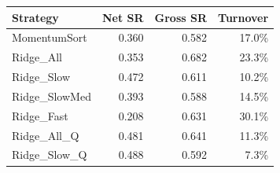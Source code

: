 \begin{tabular}{lrrr}
\toprule
Strategy & Net SR & Gross SR & Turnover \\
\midrule
MomentumSort & 0.360 & 0.582 & 17.0\% \\
Ridge\_All & 0.353 & 0.682 & 23.3\% \\
Ridge\_Slow & 0.472 & 0.611 & 10.2\% \\
Ridge\_SlowMed & 0.393 & 0.588 & 14.5\% \\
Ridge\_Fast & 0.208 & 0.631 & 30.1\% \\
Ridge\_All\_Q & 0.481 & 0.641 & 11.3\% \\
Ridge\_Slow\_Q & 0.488 & 0.592 & 7.3\% \\
\bottomrule
\end{tabular}
